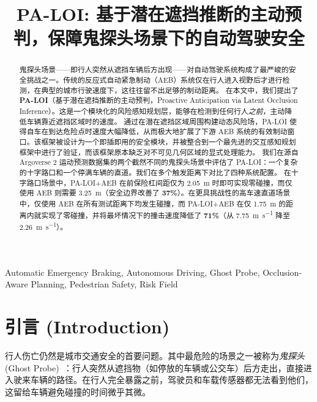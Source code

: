 \documentclass[conference]{IEEEtran}
\title{PA-LOI: 基于潜在遮挡推断的主动预判，保障鬼探头场景下的自动驾驶安全}
\begin{document}
\maketitle

\begin{abstract}
鬼探头场景——即行人突然从遮挡车辆后方出现——对自动驾驶系统构成了最严峻的安全挑战之一。传统的反应式自动紧急制动（AEB）系统仅在行人进入视野后才进行检测，在典型的城市行驶速度下，这往往留不出足够的制动距离。
在本文中，我们提出了 \textbf{PA-LOI}（基于潜在遮挡推断的主动预判，Proactive Anticipation via Latent Occlusion Inference）。这是一个模块化的风险感知规划层，能够在检测到任何行人\emph{之前}，主动降低车辆靠近遮挡区域时的速度。
通过在潜在遮挡区域周围构建动态风险场，PA-LOI 使得自车在到达危险点时速度大幅降低，从而极大地扩展了下游 AEB 系统的有效制动窗口。该框架被设计为一个即插即用的安全模块，并被整合到一个最先进的交互感知规划框架中进行了验证，而该框架原本缺乏对不可见几何区域的显式处理能力。
我们在源自 Argoverse 2 运动预测数据集的两个截然不同的鬼探头场景中评估了 PA-LOI：一个复杂的十字路口和一个停满车辆的直道。我们在多个触发距离下对比了四种系统配置。
在十字路口场景中，PA-LOI+AEB 在前保险杠间距仅为 \SI{2.05}{\meter} 时即可实现零碰撞，而仅使用 AEB 则需要 \SI{3.25}{\meter}（安全边界改善了 \textbf{37\%}）。在更具挑战性的高车速直道场景中，仅使用 AEB 在所有测试距离下均发生碰撞，而 PA-LOI+AEB 在仅 \SI{1.75}{\meter} 的距离内就实现了零碰撞，并将最坏情况下的撞击速度降低了 \textbf{71\%}（从 \SI{7.75}{\meter\per\second} 降至 \SI{2.26}{\meter\per\second}）。
\end{abstract}

\begin{IEEEkeywords}
Automatic Emergency Braking, Autonomous Driving, Ghost Probe, Occlusion-Aware Planning, Pedestrian Safety, Risk Field
\end{IEEEkeywords}

\section{引言 (Introduction)}

行人伤亡仍然是城市交通安全的首要问题。其中最危险的场景之一被称为\emph{鬼探头} (Ghost Probe)~\cite{euroncap2023}：行人突然从遮挡物（如停放的车辆或公交车）后方走出，直接进入驶来车辆的路径。在行人完全暴露之前，驾驶员和车载传感器都无法看到他们，这留给车辆避免碰撞的时间微乎其微。
\end{document}
